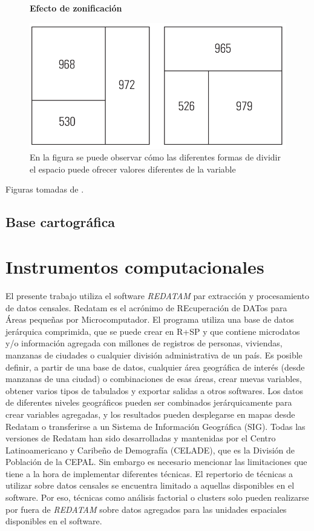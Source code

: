 \begin{figure}[htb]
	\centering
	\textbf{Efecto de zonificación}\par\medskip
	\includegraphics[scale = 0.5]{../img/capitulo3/zonificacion.png}
	\caption{En la figura se puede observar cómo las diferentes formas de dividir el espacio puede ofrecer valores diferentes de la variable}
\end{figure}
	
	Figuras tomadas de \cite{loyd}.
	
	\subsection{Base cartográfica} \label{cartografia}
	
	
	
	\section{Instrumentos computacionales}
	
El presente trabajo utiliza el software \textit{REDATAM} par extracción y procesamiento de datos censales. Redatam es el acrónimo de REcuperación de DATos para Áreas pequeñas por Microcomputador.  El programa utiliza una base de datos jerárquica comprimida, que se puede crear en R+SP y que contiene microdatos y/o información agregada con millones de registros de personas, viviendas, manzanas de ciudades o cualquier división administrativa de un país. Es posible definir, a partir de una base de datos, cualquier área geográfica de interés (desde manzanas de una ciudad) o combinaciones de esas áreas, crear nuevas variables, obtener varios tipos de tabulados y exportar salidas a otros softwares. Los datos de diferentes niveles geográficos pueden ser combinados jerárquicamente para crear variables agregadas, y los resultados pueden desplegarse en mapas desde Redatam o transferirse a un Sistema de Información Geográfica (SIG). Todas las versiones de Redatam han sido desarrolladas y mantenidas por el Centro Latinoamericano y Caribeño de Demografía (CELADE), que es la División de Población de la CEPAL. Sin embargo es necesario mencionar las limitaciones que tiene a la hora de implementar diferentes técnicas. El repertorio de técnicas a utilizar sobre datos censales se encuentra limitado a aquellas disponibles en el software. Por eso, técnicas como análisis factorial o clusters solo pueden realizarse por fuera de \textit{REDATAM} sobre datos agregados para las unidades espaciales disponibles en el software. 



